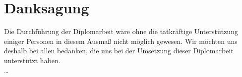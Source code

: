 
\section*{Danksagung}
Die Durchführung der Diplomarbeit wäre ohne die tatkräftige Unterstützung einiger Personen in diesem Ausmaß nicht möglich gewesen. Wir möchten uns deshalb bei allen bedanken, die uns bei der Umsetzung dieser Diplomarbeit unterstützt haben.\\
\dots